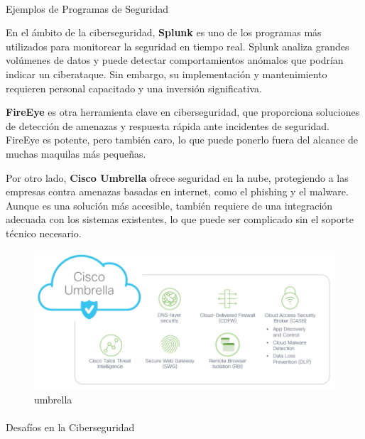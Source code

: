\documentclass[
  letterpaper,
]{book}
\makeatletter
\let\oldparagraph\paragraph
\renewcommand{\paragraph}{
    \@ifstar
      \xxxParagraphStar
      \xxxParagraphNoStar
  }
\newcommand{\xxxParagraphStar}[1]{\oldparagraph*{#1}\mbox{}}
\newcommand{\xxxParagraphNoStar}[1]{\oldparagraph{#1}\mbox{}}
\makeatother
\begin{document}
\paragraph{Ejemplos de Programas de
Seguridad}\label{ejemplos-de-programas-de-seguridad}

En el ámbito de la ciberseguridad, \textbf{Splunk} es uno de los
programas más utilizados para monitorear la seguridad en tiempo real.
Splunk analiza grandes volúmenes de datos y puede detectar
comportamientos anómalos que podrían indicar un ciberataque. Sin
embargo, su implementación y mantenimiento requieren personal capacitado
y una inversión significativa.

\textbf{FireEye} es otra herramienta clave en ciberseguridad, que
proporciona soluciones de detección de amenazas y respuesta rápida ante
incidentes de seguridad. FireEye es potente, pero también caro, lo que
puede ponerlo fuera del alcance de muchas maquilas más pequeñas.

Por otro lado, \textbf{Cisco Umbrella} ofrece seguridad en la nube,
protegiendo a las empresas contra amenazas basadas en internet, como el
phishing y el malware. Aunque es una solución más accesible, también
requiere de una integración adecuada con los sistemas existentes, lo que
puede ser complicado sin el soporte técnico necesario.

\begin{figure}[H]

{\centering \includegraphics{Img/cisco.png}

}

\caption{umbrella}

\end{figure}%

\paragraph{Desafíos en la
Ciberseguridad}\label{desafuxedos-en-la-ciberseguridad}
\end{document}
